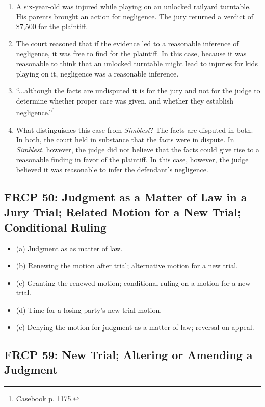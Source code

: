 \begin{enumerate}
    \item A six-year-old was injured while playing on an unlocked railyard 
    turntable. His parents brought an action for negligence. The jury returned 
    a verdict of \$7,500 for the plaintiff.
    \item The court reasoned that if the evidence led to a reasonable 
    inference of negligence, it was free to find for the plaintiff. In this 
    case, because it was reasonable to think that an unlocked turntable might 
    lead to injuries for kids playing on it, negligence was a reasonable 
    inference.
    \item ``...although the facts are undisputed it is for the jury and not 
    for the judge to determine whether proper care was given, and whether they 
    establish negligence.''\footnote{Casebook p. 1175.}
    \item What distinguishes this case from \emph{Simblest}? The facts are 
    disputed in both. In both, the court held in substance that the facts were 
    in dispute. In \emph{Simblest}, however, the judge did not believe that 
    the facts could give rise to a reasonable finding in favor of the 
    plaintiff. In this case, however, the judge believed it was reasonable to 
    infer the defendant's negligence.
\end{enumerate}

\subsection{FRCP 50: Judgment as a Matter of Law in a Jury Trial; Related 
Motion for a New Trial; Conditional Ruling}

\begin{itemize}
    \item (a) Judgment as as matter of law.
    \item (b) Renewing the motion after trial; alternative motion for a new 
    trial.
    \item (c) Granting the renewed motion; conditional ruling on a motion for 
    a new trial.
    \item (d) Time for a losing party's new-trial motion.
    \item (e) Denying the motion for judgment as a matter of law; reversal on 
    appeal.
\end{itemize}

\subsection{FRCP 59: New Trial; Altering or Amending a Judgment}

